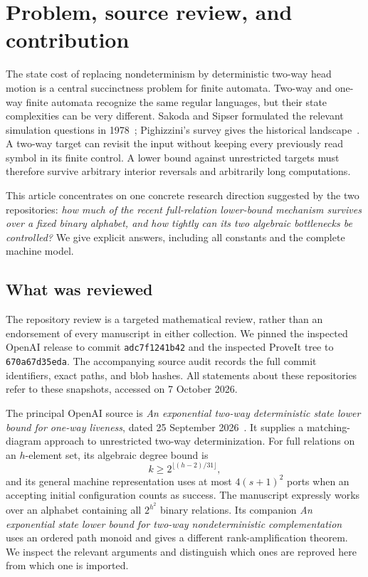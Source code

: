 \section{Problem, source review, and contribution}
\label{btc:intro:section}

The state cost of replacing nondeterminism by deterministic two-way
head motion is a central succinctness problem for finite automata.
Two-way and one-way finite automata recognize the same regular
languages, but their state complexities can be very different.
Sakoda and Sipser formulated the relevant simulation questions in
1978~\cite{SakodaSipser1978}; Pighizzini's survey gives the historical
landscape~\cite{Pighizzini2012}. A two-way target can revisit the input
without keeping every previously read symbol in its finite control.
A lower bound against unrestricted targets must therefore survive
arbitrary interior reversals and arbitrarily long computations.

This article concentrates on one concrete research direction suggested
by the two repositories: \emph{how much of the recent full-relation
lower-bound mechanism survives over a fixed binary alphabet, and how
tightly can its two algebraic bottlenecks be controlled?} We give
explicit answers, including all constants and the complete machine
model.

\subsection{What was reviewed}

The repository review is a targeted mathematical review, rather than
an endorsement of every manuscript in either collection.
We pinned the inspected OpenAI release to commit
\texttt{adc7f1241b42}
and the inspected ProveIt tree to
\texttt{670a67d35eda}.
The accompanying source audit records the full commit identifiers,
exact paths, and blob hashes.
All statements about these repositories refer to these snapshots,
accessed on 7 October 2026.

The principal OpenAI source is
\emph{An exponential two-way deterministic state lower bound for
one-way liveness}, dated 25 September 2026~\cite{OpenAILiveness2026}.
It supplies a matching-diagram approach to unrestricted two-way
determinization. For full relations on an $h$-element set, its
algebraic degree bound is
\[
 k\ge 2^{\lfloor(h-2)/31\rfloor},
\]
and its general machine representation uses at most $4(s+1)^2$
ports when an accepting initial configuration counts as success.
The manuscript expressly works over an alphabet containing all
$2^{h^2}$ binary relations. Its companion
\emph{An exponential state lower bound for two-way nondeterministic
complementation}~\cite{OpenAIComplement2026} uses an ordered path
monoid and gives a different rank-amplification theorem.
We inspect the relevant arguments and distinguish which ones are
reproved here from which one is imported.

